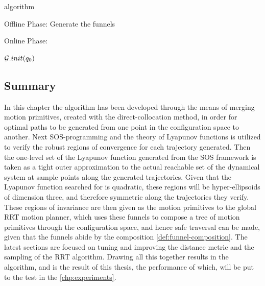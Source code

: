 \begin{algorithm}
  \caption{\rrtfunnel{} algorithm}
  \label{alg:rrtfunnel}
  \DontPrintSemicolon

   

   

  Offline Phase: Generate the funnels

  Online Phase:

  \TestUncertainFunnels{} \; \BuildComposabilityMatrix{}

  \(\mathcal{G}.\mathnormal{init}(q_0)\) 
\end{algorithm}


\subsection{Summary}

In this chapter the \rrtfunnel{} algorithm has been developed through the means
of merging motion primitives, created with the direct-collocation method, in
order for optimal paths to be generated from one point in the configuration
space to another. Next \ac{SOS}-programming and the theory of Lyapunov functions
is utilized to verify the robust regions of convergence for each trajectory
generated. Then the one-level set of the Lyapunov function generated from the
\ac{SOS} framework is taken as a tight outer approximation to the actual
reachable set of the dynamical system at sample points along the generated
trajectories. Given that the Lyapunov function searched for is quadratic, these
regions will be hyper-ellipsoids of dimension three, and therefore symmetric
along the trajectories they verify. These regions of invariance are then given
as the motion primitives to the global \ac{RRT} motion planner, which uses these
funnels to compose a tree of motion primitives through the configuration space,
and hence safe traversal can be made, given that the funnels abide by the
composition \cref{def:funnel-composition}. The latest sections are focused on
tuning and improving the distance metric and the sampling of the \ac{RRT}
algorithm. Drawing all this together results in the \rrtfunnel{} algorithm, and
is the result of this thesis, the performance of which, will be put to the test
in the \cref{chp:experiments}.
